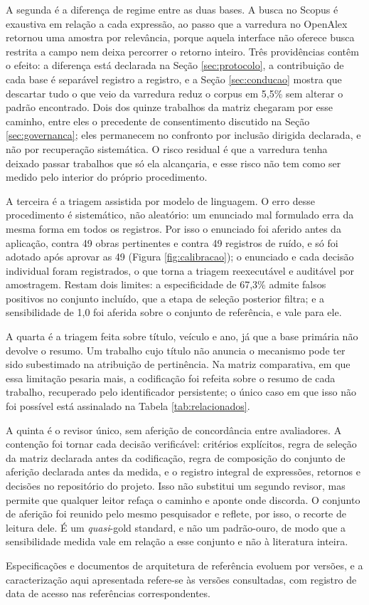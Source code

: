 A segunda é a diferença de regime entre as duas bases. A busca no Scopus é exaustiva em relação a cada expressão, ao passo que a varredura no OpenAlex retornou uma amostra por relevância, porque aquela interface não oferece busca restrita a campo nem deixa percorrer o retorno inteiro. Três providências contêm o efeito: a diferença está declarada na Seção \ref{sec:protocolo}, a contribuição de cada base é separável registro a registro, e a Seção \ref{sec:conducao} mostra que descartar tudo o que veio da varredura reduz o corpus em 5,5\% sem alterar o padrão encontrado. Dois dos quinze trabalhos da matriz chegaram por esse caminho, entre eles o precedente de consentimento discutido na Seção \ref{sec:governanca}; eles permanecem no confronto por inclusão dirigida declarada, e não por recuperação sistemática. O risco residual é que a varredura tenha deixado passar trabalhos que só ela alcançaria, e esse risco não tem como ser medido pelo interior do próprio procedimento.

A terceira é a triagem assistida por modelo de linguagem. O erro desse procedimento é sistemático, não aleatório: um enunciado mal formulado erra da mesma forma em todos os registros. Por isso o enunciado foi aferido antes da aplicação, contra 49 obras pertinentes e contra 49 registros de ruído, e só foi adotado após aprovar as 49 (Figura \ref{fig:calibracao}); o enunciado e cada decisão individual foram registrados, o que torna a triagem reexecutável e auditável por amostragem. Restam dois limites: a especificidade de 67,3\% admite falsos positivos no conjunto incluído, que a etapa de seleção posterior filtra; e a sensibilidade de 1,0 foi aferida sobre o conjunto de referência, e vale para ele.

A quarta é a triagem feita sobre título, veículo e ano, já que a base primária não devolve o resumo. Um trabalho cujo título não anuncia o mecanismo pode ter sido subestimado na atribuição de pertinência. Na matriz comparativa, em que essa limitação pesaria mais, a codificação foi refeita sobre o resumo de cada trabalho, recuperado pelo identificador persistente; o único caso em que isso não foi possível está assinalado na Tabela \ref{tab:relacionados}.

A quinta é o revisor único, sem aferição de concordância entre avaliadores. A contenção foi tornar cada decisão verificável: critérios explícitos, regra de seleção da matriz declarada antes da codificação, regra de composição do conjunto de aferição declarada antes da medida, e o registro integral de expressões, retornos e decisões no repositório do projeto. Isso não substitui um segundo revisor, mas permite que qualquer leitor refaça o caminho e aponte onde discorda. O conjunto de aferição foi reunido pelo mesmo pesquisador e reflete, por isso, o recorte de leitura dele. É um \textit{quasi}-gold standard, e não um padrão-ouro, de modo que a sensibilidade medida vale em relação a esse conjunto e não à literatura inteira.

Especificações e documentos de arquitetura de referência evoluem por versões, e a caracterização aqui apresentada refere-se às versões consultadas, com registro de data de acesso nas referências correspondentes.
